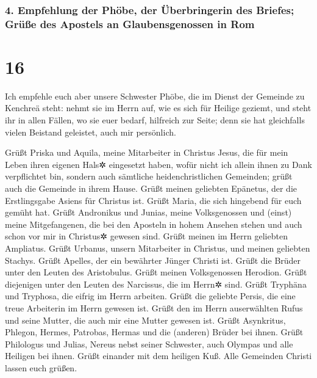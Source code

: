\hypertarget{empfehlung-der-phuxf6be-der-uxfcberbringerin-des-briefes-gruxfcuxdfe-des-apostels-an-glaubensgenossen-in-rom}{%
\subsubsection{4. Empfehlung der Phöbe, der Überbringerin des Briefes;
Grüße des Apostels an Glaubensgenossen in
Rom}\label{empfehlung-der-phuxf6be-der-uxfcberbringerin-des-briefes-gruxfcuxdfe-des-apostels-an-glaubensgenossen-in-rom}}

\hypertarget{section-15}{%
\section{16}\label{section-15}}

 Ich empfehle euch aber unsere Schwester Phöbe, die im
Dienst der Gemeinde zu Kenchreä steht:  nehmt sie im Herrn
auf, wie es sich für Heilige geziemt, und steht ihr in allen Fällen, wo
sie euer bedarf, hilfreich zur Seite; denn sie hat gleichfalls vielen
Beistand geleistet, auch mir persönlich.

 Grüßt Priska und Aquila, meine Mitarbeiter in Christus
Jesus,  die für mein Leben ihren eigenen Hals✲ eingesetzt
haben, wofür nicht ich allein ihnen zu Dank verpflichtet bin, sondern
auch sämtliche heidenchristlichen Gemeinden;  grüßt auch
die Gemeinde in ihrem Hause. Grüßt meinen geliebten Epänetus, der die
Erstlingsgabe Asiens für Christus ist.  Grüßt Maria, die
sich hingebend für euch gemüht hat.  Grüßt Andronikus und
Junias, meine Volksgenossen und (einst) meine Mitgefangenen, die bei den
Aposteln in hohem Ansehen stehen und auch schon vor mir in Christus✲
gewesen sind.  Grüßt meinen im Herrn geliebten Ampliatus.
 Grüßt Urbanus, unsern Mitarbeiter in Christus, und meinen
geliebten Stachys.  Grüßt Apelles, der ein bewährter
Jünger Christi ist. Grüßt die Brüder unter den Leuten des Aristobulus.
 Grüßt meinen Volksgenossen Herodion. Grüßt diejenigen
unter den Leuten des Narcissus, die im Herrn✲ sind. 
Grüßt Tryphäna und Tryphosa, die eifrig im Herrn arbeiten. Grüßt die
geliebte Persis, die eine treue Arbeiterin im Herrn gewesen ist.
 Grüßt den im Herrn auserwählten Rufus und seine Mutter,
die auch mir eine Mutter gewesen ist.  Grüßt Asynkritus,
Phlegon, Hermes, Patrobas, Hermas und die (anderen) Brüder bei ihnen.
 Grüßt Philologus und Julias, Nereus nebst seiner
Schwester, auch Olympas und alle Heiligen bei ihnen. 
Grüßt einander mit dem heiligen Kuß. Alle Gemeinden Christi lassen euch
grüßen.

